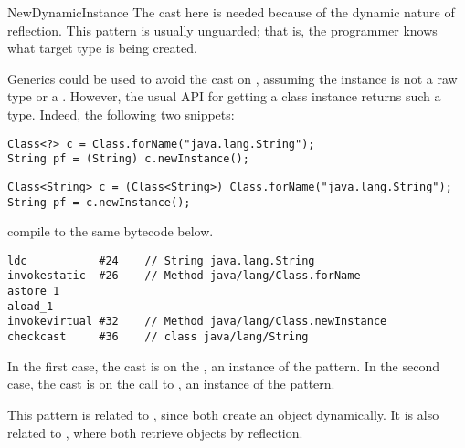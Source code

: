 \begin{pattern}{NewDynamicInstance}
\discussion{}
The cast here is needed because of the dynamic nature of reflection.
This pattern is usually unguarded; that is,
the programmer knows what target type is being created.

Generics could be used to avoid the cast on , assuming the  instance is 
not a raw type or a .
However, the usual API for getting a class instance 
returns such a type.
Indeed, the following two snippets:

\begin{verbatim}
Class<?> c = Class.forName("java.lang.String");
String pf = (String) c.newInstance();
\end{verbatim}

\begin{verbatim}
Class<String> c = (Class<String>) Class.forName("java.lang.String");
String pf = c.newInstance();
\end{verbatim}

compile to the same bytecode below.

\begin{lstlisting}[style=bytecode]
ldc           #24    // String java.lang.String
invokestatic  #26    // Method java/lang/Class.forName
astore_1
aload_1
invokevirtual #32    // Method java/lang/Class.newInstance
checkcast     #36    // class java/lang/String
\end{lstlisting}


In the first case, the cast is on the , an instance of the
\thisp{} pattern. In the second case, the cast is on the call to
, an instance of the  pattern.

This pattern is related to ,
since both create an object dynamically.
It is also related to ,
where both retrieve objects by reflection.

\end{pattern}